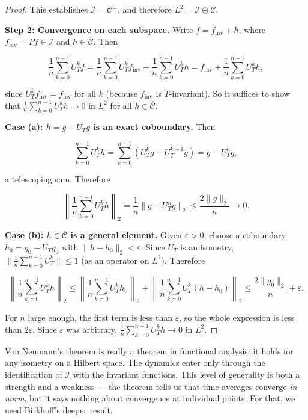 \begin{proof}
This establishes $\mathcal{I} = \mathcal{C}^\perp$, and therefore $L^2 = \mathcal{I} \oplus \overline{\mathcal{C}}$.

\textbf{Step 2: Convergence on each subspace.} Write $f = f_{\text{inv}} + h$, where $f_{\text{inv}} = Pf \in \mathcal{I}$ and $h \in \overline{\mathcal{C}}$. Then

\[
\frac{1}{n} \sum_{k=0}^{n-1} U_T^k f = \frac{1}{n} \sum_{k=0}^{n-1} U_T^k f_{\text{inv}} + \frac{1}{n} \sum_{k=0}^{n-1} U_T^k h = f_{\text{inv}} + \frac{1}{n} \sum_{k=0}^{n-1} U_T^k h,
\]

since $U_T^k f_{\text{inv}} = f_{\text{inv}}$ for all $k$ (because $f_{\text{inv}}$ is $T$-invariant). So it suffices to show that $\frac{1}{n}\sum_{k=0}^{n-1} U_T^k h \to 0$ in $L^2$ for all $h \in \overline{\mathcal{C}}$.

\textbf{Case (a): $h = g - U_T g$ is an exact coboundary.} Then

\[
\sum_{k=0}^{n-1} U_T^k h = \sum_{k=0}^{n-1} (U_T^k g - U_T^{k+1} g) = g - U_T^n g,
\]

a telescoping sum. Therefore

\[
\left\| \frac{1}{n} \sum_{k=0}^{n-1} U_T^k h \right\|_2 = \frac{1}{n}\|g - U_T^n g\|_2 \leq \frac{2\|g\|_2}{n} \to 0.
\]

\textbf{Case (b): $h \in \overline{\mathcal{C}}$ is a general element.} Given $\varepsilon > 0$, choose a coboundary $h_0 = g_0 - U_T g_0$ with $\|h - h_0\|_2 < \varepsilon$. Since $U_T$ is an isometry, $\|\frac{1}{n}\sum_{k=0}^{n-1} U_T^k\| \leq 1$ (as an operator on $L^2$). Therefore

\[
\left\| \frac{1}{n} \sum_{k=0}^{n-1} U_T^k h \right\|_2 \leq \left\| \frac{1}{n} \sum_{k=0}^{n-1} U_T^k h_0 \right\|_2 + \left\| \frac{1}{n} \sum_{k=0}^{n-1} U_T^k (h - h_0) \right\|_2 \leq \frac{2\|g_0\|_2}{n} + \varepsilon.
\]

For $n$ large enough, the first term is less than $\varepsilon$, so the whole expression is less than $2\varepsilon$. Since $\varepsilon$ was arbitrary, $\frac{1}{n}\sum_{k=0}^{n-1} U_T^k h \to 0$ in $L^2$.
\end{proof}


\begin{remark}
Von Neumann's theorem is really a theorem in functional analysis: it holds for any isometry on a Hilbert space. The dynamics enter only through the identification of $\mathcal{I}$ with the invariant functions. This level of generality is both a strength and a weakness --- the theorem tells us that time averages converge \textit{in norm}, but it says nothing about convergence at individual points. For that, we need Birkhoff's deeper result.
\end{remark}


